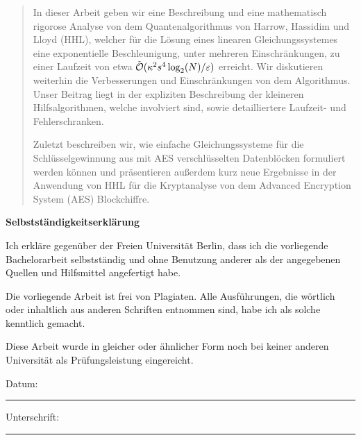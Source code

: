 \begin{adjustwidth}{2cm}{2cm}
\begin{abstract}
        \noindent In dieser Arbeit geben wir eine Beschreibung und eine mathematisch rigorose Analyse von dem Quantenalgorithmus von Harrow, Hassidim und Lloyd (HHL), welcher für die Lösung eines linearen Gleichungssystemes eine exponentielle Beschleunigung, unter mehreren Einschränkungen, zu einer Laufzeit von etwa \(\tilde{\operatorname{\mathcal{O}}}(\kappa^2s^4\log_2(N)/\varepsilon)\) erreicht. Wir diskutieren weiterhin die Verbesserungen und Einschränkungen von dem Algorithmus. Unser Beitrag liegt in der expliziten Beschreibung der kleineren Hilfsalgorithmen, welche involviert sind, sowie detailliertere Laufzeit- und Fehlerschranken.
        
        \noindent Zuletzt beschreiben wir, wie einfache Gleichungssysteme für die Schlüsselgewinnung aus mit AES verschlüsselten Datenblöcken formuliert werden können und präsentieren außerdem kurz neue Ergebnisse in der Anwendung von HHL für die Kryptanalyse von dem Advanced Encryption System (AES) Blockchiffre.
    \end{abstract}

    \newpage

    \begin{center}
        \textbf{Selbstständigkeitserklärung}
    \end{center}

    \vspace{0.5\baselineskip}

    Ich erkläre gegenüber der Freien Universität Berlin, dass ich die vorliegende Bachelorarbeit selbstständig und ohne Benutzung anderer als der angegebenen Quellen und Hilfsmittel angefertigt habe.

    \vspace{0.5\baselineskip}

    Die vorliegende Arbeit ist frei von Plagiaten. Alle Ausführungen, die wörtlich oder inhaltlich aus anderen Schriften entnommen sind, habe ich als solche kenntlich gemacht.

    \vspace{0.5\baselineskip}

    Diese Arbeit wurde in gleicher oder ähnlicher Form noch bei keiner anderen Universität als Prüfungsleistung eingereicht.

    \vspace{\baselineskip}

    \vspace{\baselineskip}

    Datum: \rule{3cm}{0.5pt} \hfill Unterschrift: \rule{5cm}{0.5pt}

    \vspace{10\baselineskip}
\end{adjustwidth}

